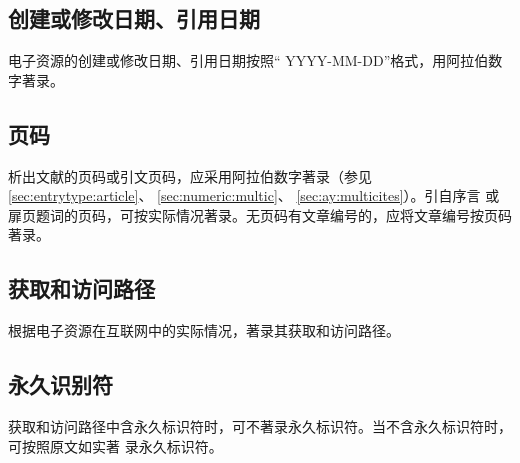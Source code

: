 \documentclass[twoside]{article}%
\begin{document}
\begin{refsection}

\nocite{egbookpubdated--}
\nocite{egbookpubdatee--}
\nocite{egbookpubdatef--}

{}
\end{refsection}




\subsection{创建或修改日期、引用日期}

电子资源的创建或修改日期、引用日期按照“ YYYY-MM-DD”格式，用阿拉伯数字著录。
\begin{refsection}
\nocite{egbookpubdateg--}

{}
\end{refsection}

\subsection{页码}\label{sec:item:pages}
析出文献的页码或引文页码，应采用阿拉伯数字著录（参见 \ref{sec:entrytype:article}、 \ref{sec:numeric:multic}、 \ref{sec:ay:multicites}）。引自序言
或扉页题词的页码，可按实际情况著录。无页码有文章编号的，应将文章编号按页码著录。

\begin{refsection}
\nocite{曹凌2011-19-}
\nocite{钱学森2001--}
\nocite{冯友兰2008--}
\nocite{李约瑟1991--}
\nocite{DUBAR2013--}
\nocite{MAURYA2023}

{\printbibliography[heading=none,env=exampleenv]}
\end{refsection}


\subsection{获取和访问路径}
根据电子资源在互联网中的实际情况，著录其获取和访问路径。

\begin{refsection}

\nocite{储大同2010-721-724,weiner2010-38}

{\printbibliography[heading=none,env=exampleenv]}
\end{refsection}

\subsection{永久识别符}
获取和访问路径中含永久标识符时，可不著录永久标识符。当不含永久标识符时，可按照原文如实著
录永久标识符。
\end{document}
